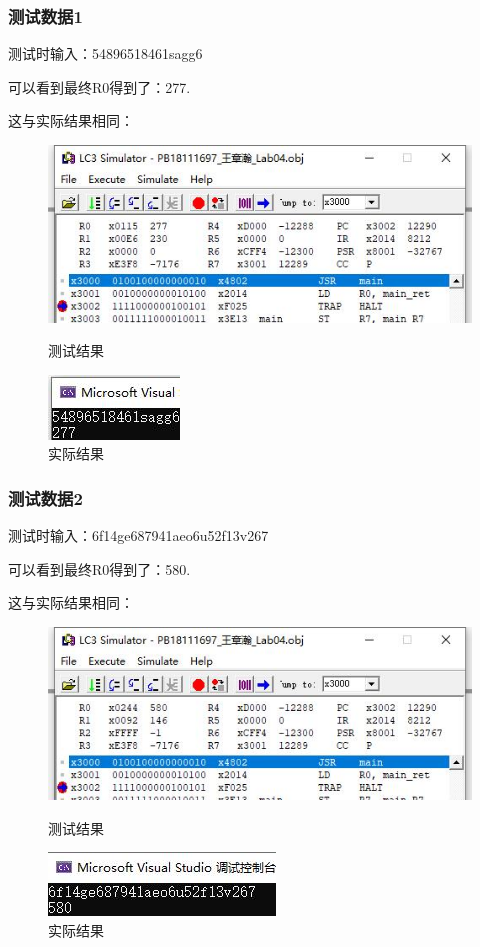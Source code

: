 \documentclass[UTF8]{article}
\begin{document}
\subsubsection{测试数据1}
测试时输入：54896518461sagg6\par
可以看到最终R0得到了：277.\par
这与实际结果相同：
\begin{figure}[H]
	\begin{minipage}[H]{0.48\linewidth}
		\centering
		\includegraphics[scale=0.45]{test1.jpg}
		\caption{测试结果}
		\label{test1}
	\end{minipage}
	\qquad
	\begin{minipage}[H]{0.48\linewidth}
		\centering
		\includegraphics[scale=1]{test1_a.jpg}
		\caption{实际结果}
		\label{test1_a}
	\end{minipage}
\end{figure}
\subsubsection{测试数据2}
测试时输入：6f14ge687941aeo6u52f13v267\par
可以看到最终R0得到了：580.\par
这与实际结果相同：
\begin{figure}[H]
\begin{minipage}[H]{0.48\linewidth}
	\centering
	\includegraphics[scale=0.45]{test2.jpg}
	\caption{测试结果}
	\label{test2}
\end{minipage}
\qquad
\begin{minipage}[H]{0.48\linewidth}
	\centering
	\includegraphics[scale=1]{test2_a.jpg}
	\caption{实际结果}
	\label{test2_a}
\end{minipage}
\end{figure}
\end{document}
